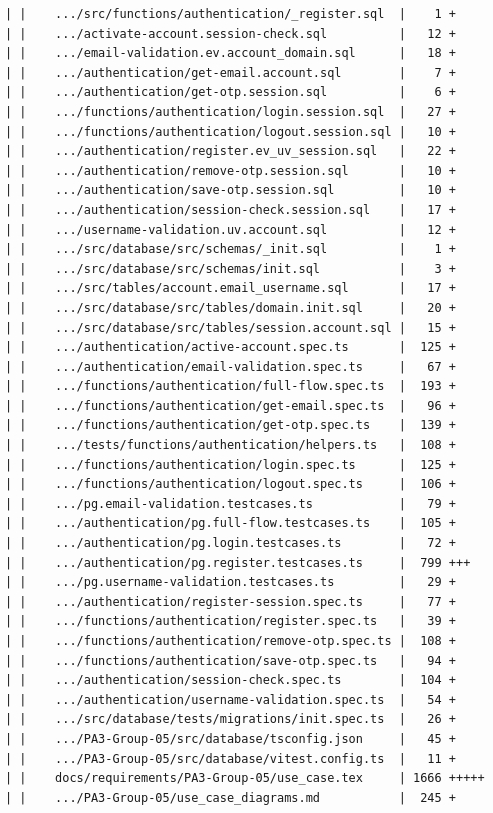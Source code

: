 \documentclass[12pt]{article}
\begin{document}
\begin{lstlisting}[numbers=none,breaklines=true]
| |    .../src/functions/authentication/_register.sql  |    1 +
| |    .../activate-account.session-check.sql          |   12 +
| |    .../email-validation.ev.account_domain.sql      |   18 +
| |    .../authentication/get-email.account.sql        |    7 +
| |    .../authentication/get-otp.session.sql          |    6 +
| |    .../functions/authentication/login.session.sql  |   27 +
| |    .../functions/authentication/logout.session.sql |   10 +
| |    .../authentication/register.ev_uv_session.sql   |   22 +
| |    .../authentication/remove-otp.session.sql       |   10 +
| |    .../authentication/save-otp.session.sql         |   10 +
| |    .../authentication/session-check.session.sql    |   17 +
| |    .../username-validation.uv.account.sql          |   12 +
| |    .../src/database/src/schemas/_init.sql          |    1 +
| |    .../src/database/src/schemas/init.sql           |    3 +
| |    .../src/tables/account.email_username.sql       |   17 +
| |    .../src/database/src/tables/domain.init.sql     |   20 +
| |    .../src/database/src/tables/session.account.sql |   15 +
| |    .../authentication/active-account.spec.ts       |  125 +
| |    .../authentication/email-validation.spec.ts     |   67 +
| |    .../functions/authentication/full-flow.spec.ts  |  193 +
| |    .../functions/authentication/get-email.spec.ts  |   96 +
| |    .../functions/authentication/get-otp.spec.ts    |  139 +
| |    .../tests/functions/authentication/helpers.ts   |  108 +
| |    .../functions/authentication/login.spec.ts      |  125 +
| |    .../functions/authentication/logout.spec.ts     |  106 +
| |    .../pg.email-validation.testcases.ts            |   79 +
| |    .../authentication/pg.full-flow.testcases.ts    |  105 +
| |    .../authentication/pg.login.testcases.ts        |   72 +
| |    .../authentication/pg.register.testcases.ts     |  799 +++
| |    .../pg.username-validation.testcases.ts         |   29 +
| |    .../authentication/register-session.spec.ts     |   77 +
| |    .../functions/authentication/register.spec.ts   |   39 +
| |    .../functions/authentication/remove-otp.spec.ts |  108 +
| |    .../functions/authentication/save-otp.spec.ts   |   94 +
| |    .../authentication/session-check.spec.ts        |  104 +
| |    .../authentication/username-validation.spec.ts  |   54 +
| |    .../src/database/tests/migrations/init.spec.ts  |   26 +
| |    .../PA3-Group-05/src/database/tsconfig.json     |   45 +
| |    .../PA3-Group-05/src/database/vitest.config.ts  |   11 +
| |    docs/requirements/PA3-Group-05/use_case.tex     | 1666 +++++
| |    .../PA3-Group-05/use_case_diagrams.md           |  245 +

\end{lstlisting}
\end{document}
